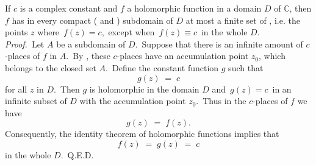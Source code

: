 \documentclass[12pt]{article}
\theoremstyle{definition}
\begin{document}
If $c$ is a complex constant and $f$ a holomorphic function in a domain $D$ of $\mathbb{C}$, then $f$ has in every compact ( and ) subdomain of $D$ at most a finite set of , i.e. the points $z$ where\, $f(z) = c$,\, except when\, $f(z) \equiv c$\, in the whole $D$.\\

\emph{Proof.}\, Let $A$ be a  subdomain of $D$.\, Suppose that there is an infinite amount of $c$-places of $f$ in $A$.\, By , these $c$-places have an accumulation point $z_0$, which belongs to the closed set $A$.\, Define the constant function $g$ such that
$$g(z) \;=\; c$$
for all $z$ in $D$.\, Then $g$ is holomorphic in the domain $D$ and\, $g(z) = c$\, in an infinite subset of $D$ with the accumulation point $z_0$.\, Thus in the $c$-places of $f$ we have
$$g(z) \;=\; f(z).$$
Consequently, the identity theorem of holomorphic functions implies that
$$f(z) \;=\; g(z) \;=\; c$$
in the whole $D$.\, Q.E.D.
\end{document}
